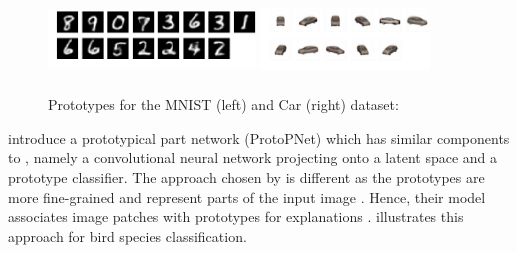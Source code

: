 \begin{figure}[h]
    \centering
    \includegraphics[width=0.49\textwidth, height=2cm]{Figures/Chapter3/prototype_result-1499.png}
    \includegraphics[width=0.4\textwidth, height=2cm]{Figures/Chapter3/car_both_R1_and_R2_new.png}
    \caption[Prototypes for the MNIST and Car dataset]{Prototypes for the MNIST (left) and Car (right) dataset: \citep{LiLCR18}}
    \label{fig:prototypes}
\end{figure}

\citet{ChenLTBRS19} introduce a prototypical part network (ProtoPNet) which has similar components to \citet{LiLCR18}, namely a convolutional neural network projecting onto a latent space and a prototype classifier. The approach chosen by \citet{ChenLTBRS19} is different as the prototypes are more fine-grained and represent parts of the input image \citep{xie2020explainable}. Hence, their model associates image patches with prototypes for explanations \citep{xie2020explainable}.  illustrates this approach for bird species classification.

